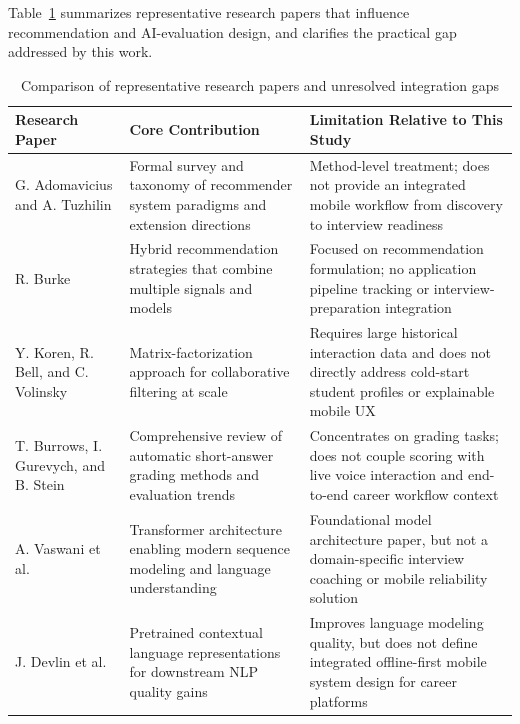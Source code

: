 \documentclass[conference]{IEEEtran}
\begin{document}
Table~\ref{tab:paper-comparison} summarizes representative research papers that influence recommendation and AI-evaluation design, and clarifies the practical gap addressed by this work.

\begin{table}[!tb]
\centering
\setlength{\tabcolsep}{4pt}
\normalsize
\begin{tabularx}{\textwidth}{|>{\RaggedRight\arraybackslash}X|>{\RaggedRight\arraybackslash}X|>{\RaggedRight\arraybackslash}X|}
\hline
 \textbf{Research Paper} & \textbf{Core Contribution} & \textbf{Limitation Relative to This Study} \\
\hline
 G. Adomavicius and A. Tuzhilin \cite{ref21} & Formal survey and taxonomy of recommender system paradigms and extension directions & Method-level treatment; does not provide an integrated mobile workflow from discovery to interview readiness \\
\hline
 R. Burke \cite{ref22} & Hybrid recommendation strategies that combine multiple signals and models & Focused on recommendation formulation; no application pipeline tracking or interview-preparation integration \\
\hline
 Y. Koren, R. Bell, and C. Volinsky \cite{ref23} & Matrix-factorization approach for collaborative filtering at scale & Requires large historical interaction data and does not directly address cold-start student profiles or explainable mobile UX \\
\hline
 T. Burrows, I. Gurevych, and B. Stein \cite{ref24} & Comprehensive review of automatic short-answer grading methods and evaluation trends & Concentrates on grading tasks; does not couple scoring with live voice interaction and end-to-end career workflow context \\
\hline
 A. Vaswani et al. \cite{ref25} & Transformer architecture enabling modern sequence modeling and language understanding & Foundational model architecture paper, but not a domain-specific interview coaching or mobile reliability solution \\
\hline
 J. Devlin et al. \cite{ref26} & Pretrained contextual language representations for downstream NLP quality gains & Improves language modeling quality, but does not define integrated offline-first mobile system design for career platforms \\
\hline
\end{tabularx}
\caption{Comparison of representative research papers and unresolved integration gaps}
\label{tab:paper-comparison}
\end{table}
\end{document}
